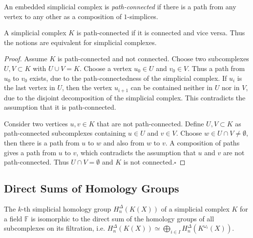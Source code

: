 \documentclass[envcountsect,runningheads]{llncs}
\renewcommand{\qed}{\hfill$\square$}
\begin{document}
\begin{definition}
An embedded simplicial complex is \emph{path-connected} if there is a path from any vertex to any other as a composition of $1$-simplices.
\end{definition}

\begin{propositionsec}
A simplicial complex $K$ is path-connected if it is connected and vice versa. Thus the notions are equivalent for simplicial complexes.
\end{propositionsec}

\begin{proof}
Assume $K$ is path-connected and not connected. Choose two subcomplexes $U,V \subset K$ with $U \cup V = K$. Choose a vertex $u_0 \in U$ and $v_0 \in V$. Thus a path from $u_0$ to $v_0$ exists, due to the path-connectedness of the simplicial complex. If $u_i$ is the last vertex in $U$, then the vertex $u_{i+1}$ can be contained neither in $U$ nor in $V$, due to the disjoint decomposition of the simplicial complex. This contradicts the assumption that it is path-connected. 

Consider two vertices $u,v \in K$ that are not path-connected. Define $U,V \subset K$ as path-connected subcomplexes containing $u\in U$ and $v \in V$.  Choose $w \in U \cap V \neq \emptyset$, then there is a path from $u$ to $w$ and also from $w$ to $v$. A composition of paths gives a path from $u$ to $v$, which contradicts the assumption that $u$ and $v$ are not path-connected. Thus $U \cap V = \emptyset$ and $K$ is not connected.\qed
\end{proof}

\subsection{Direct Sums of Homology Groups}
\label{directsums}
\begin{theorem}{\cite[p.~109]{hatcher2002algebraic}}
The $k$-th simplicial homology group $H^{\Delta}_n(K(X))$ of a simplicial complex $K$ for a field $\mathbb{F}$ is isomorphic to the direct sum of the homology groups of all subcomplexes on its filtration, i.e. $H^{\Delta}_n(K(X)) \simeq \bigoplus_{i \in I} H^{\Delta}_n(K^{\omega_{i}}(X))$.
\end{theorem}
\end{document}
